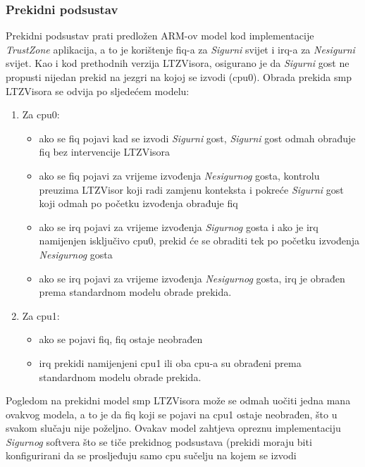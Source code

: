 \documentclass[times, utf8, diplomski, numeric]{fer}
\begin{document}
\subsubsection{Prekidni podsustav}
Prekidni podsustav prati predložen ARM-ov model kod implementacije \textit{TrustZone} aplikacija, a to je korištenje \gls{fiq}-a za
\textit{Sigurni} svijet i \gls{irq}-a za \textit{Nesigurni} svijet. Kao i kod prethodnih verzija LTZVisora,
osigurano je da \textit{Sigurni} gost ne propusti nijedan prekid na jezgri na kojoj se izvodi (\gls{cpu}0). Obrada prekida \gls{smp}
LTZVisora se odvija po sljedećem modelu:
\begin{enumerate}
  \item{Za \gls{cpu}0:}
    \begin{itemize}
      \item{ako se \gls{fiq} pojavi kad se izvodi \textit{Sigurni} gost, \textit{Sigurni} gost odmah obrađuje \gls{fiq} bez intervencije
      LTZVisora}
      \item{ako se \gls{fiq} pojavi za vrijeme izvođenja \textit{Nesigurnog} gosta, kontrolu preuzima LTZVisor koji radi zamjenu
      konteksta i pokreće \textit{Sigurni} gost koji odmah po početku izvođenja obrađuje \gls{fiq}}
      \item{ako se \gls{irq} pojavi za vrijeme izvođenja \textit{Sigurnog} gosta i ako je \gls{irq} namijenjen isključivo \gls{cpu}0, prekid će
      se obraditi tek po početku izvođenja \textit{Nesigurnog} gosta}
      \item{ako se \gls{irq} pojavi za vrijeme izvođenja \textit{Nesigurnog} gosta, \gls{irq} je obrađen prema standardnom modelu obrade
      prekida.}
    \end{itemize}
  \item{Za \gls{cpu}1:}
    \begin{itemize}
      \item{ako se pojavi \gls{fiq}, \gls{fiq} ostaje neobrađen}
      \item{\gls{irq} prekidi namijenjeni \gls{cpu}1 ili oba \gls{cpu}-a su obrađeni prema standardnom modelu obrade prekida.}
    \end{itemize}
\end{enumerate}
Pogledom na prekidni model \gls{smp} LTZVisora može se odmah uočiti jedna mana ovakvog modela, a to je da \gls{fiq} koji se pojavi na \gls{cpu}1
ostaje neobrađen, što u svakom slučaju nije poželjno. Ovakav model zahtjeva opreznu implementaciju \textit{Sigurnog} softvera
što se tiče prekidnog podsustava (prekidi moraju biti konfigurirani da se prosljeđuju samo \gls{cpu} sučelju na kojem se izvodi
\end{document}
